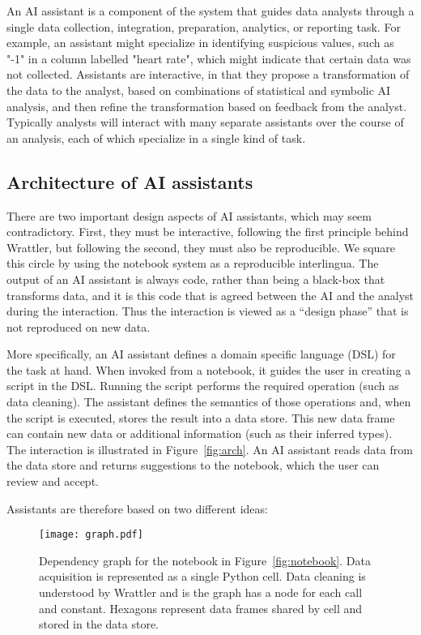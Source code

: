 \documentclass[sigplan,preprint,10pt]{acmart}\settopmatter{printfolios=true,printccs=false,printacmref=false}
\begin{document}
{
An AI assistant is a component
of the system that
guides data analysts through a single data collection, integration, preparation,
analytics, or reporting task.
For example, an assistant might
specialize in identifying suspicious
values, such as "-1" in a column labelled
"heart rate", which might indicate
that certain data was not collected.
Assistants are interactive, in that
they propose a transformation
of the data to the analyst, based on combinations
of statistical and symbolic AI analysis,
and then refine the transformation
based on feedback from the analyst.
Typically analysts will interact with many separate assistants over
the course of an analysis, each of which specialize in a single kind of task.

\subsection{Architecture of AI assistants}

There are two important design aspects of AI assistants, which may seem
contradictory.
 First, they must be interactive, following
 the first principle behind Wrattler, but
 following the second,
 they must also be reproducible.
We square this circle by using the notebook
system as a reproducible interlingua.
The output of an AI assistant is always code, rather
than being a black-box that transforms data,
and it is this code that is agreed between the AI and the analyst during the interaction.
Thus the interaction is viewed as a ``design phase''
that is not reproduced on new data.

More specifically, an AI assistant defines a domain specific language (DSL) for the task at hand. When invoked from
a notebook, it guides the user in creating a script in the DSL. Running the script performs
the required operation (such as data cleaning). The assistant defines the semantics
of those operations and, when the script is executed, stores the result into a data
store. This new data frame can contain new data or additional information (such as their
inferred types).
The interaction is illustrated in Figure~\ref{fig:arch}. An AI assistant reads data from the data
store and returns suggestions to the notebook, which the user can review and accept.

Assistants are therefore based on two different ideas:

\begin{figure}
\texttt{[image: graph.pdf]}

\caption{\small{Dependency graph for the notebook in Figure~\ref{fig:notebook}.
Data acquisition is represented as a single Python cell. Data cleaning is understood
by Wrattler and is the graph has a node for each call and constant. Hexagons represent
data frames shared by cell and stored in the data store.}}
\label{fig:deps}
\vspace{-0.5em}
\end{figure}

}
\end{document}

